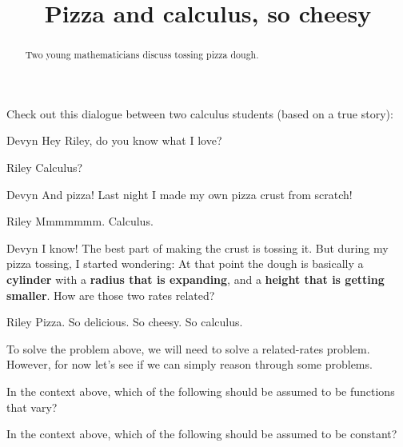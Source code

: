 \documentclass{ximera}
\title[Break-Ground:]{Pizza and calculus, so cheesy}
\begin{document}
\begin{abstract}
Two young mathematicians discuss tossing pizza dough. 
\end{abstract}
\maketitle

Check out this dialogue between two calculus students (based on a true
story):


\begin{dialogue}
\item[Devyn] Hey Riley, do you know what I love?
\item[Riley] Calculus? 
\item[Devyn] And pizza! Last night I made my own pizza crust from
  scratch!
\item[Riley] Mmmmmmm. Calculus. 
\item[Devyn] I know! The best part of making the crust is tossing it.
  But during my pizza tossing, I started wondering: At that point the
  dough is basically a \textbf{cylinder} with a \textbf{radius that is
    expanding}, and a \textbf{height that is getting smaller}. How are
  those two rates related?
\item[Riley] Pizza. So delicious. So cheesy. So calculus.
\end{dialogue}

To solve the problem above, we will need to solve a related-rates
problem. However, for now let's see if we can simply reason through
some problems.


\begin{problem}
  In the context above, which of the following should be assumed to be
  functions that vary?
  \begin{multipleResponse}
  \end{multipleResponse}
\end{problem}

\begin{problem}
  In the context above, which of the following should be assumed to be
  constant?
  \begin{multipleResponse}
  \end{multipleResponse}
\end{problem}



\end{document}
